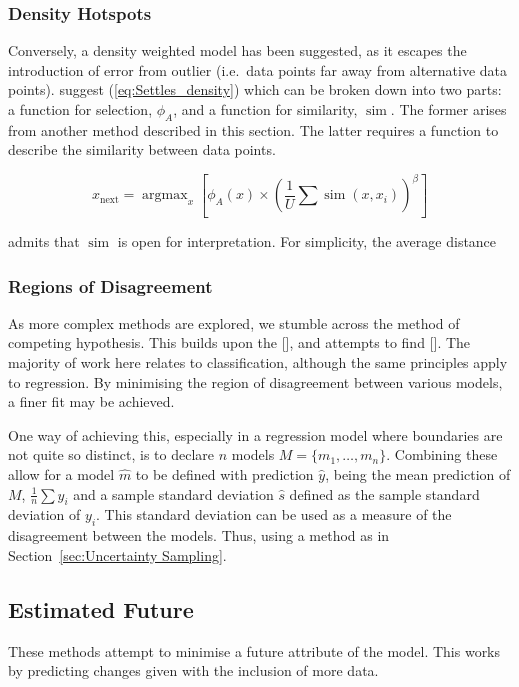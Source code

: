 \documentclass[a4paper, english]{report}
\DeclareMathOperator*{\argmax}{argmax}
\DeclareMathOperator*{\simm}{sim}
\begin{document}
\subsubsection{Density Hotspots}
Conversely, a density weighted model has been suggested, as it escapes the introduction of error from outlier (i.e.\ data points far away from alternative data points). \textcite{Settles_2008} suggest (\ref{eq:Settles_density}) which can be broken down into two parts: a function for selection, $\phi_A$, and a function for similarity, $\simm$. The former arises from  another method described in this section. The latter requires a function to describe the similarity between data points.

\begin{equation}
    \label{eq:Settles_density}
    x_\mathrm{next}=\argmax_x{\left[\phi_A(x)\times{\left(\frac{1}{U}\sum{\simm{(x, x_i)}}\right)}^\beta\right]}
\end{equation}

\textcite{Settles_2008} admits that $\simm$ is open for interpretation. For simplicity, the average distance

\subsubsection{Regions of Disagreement}
As more complex methods are explored, we stumble across the method of competing hypothesis. This builds upon the [], and attempts to find []. The majority of work here relates to classification, although the same principles apply to regression. By minimising the region of disagreement between various models, a finer fit may be achieved.

One way of achieving this, especially in a regression model where boundaries are not quite so distinct, is to declare $n$ models ${M = \{m_1,\ldots{}, m_n\}}$. Combining these allow for a model $\hat{m}$ to be defined with prediction $\hat{y}$, being the mean prediction of $M$, ${\frac{1}{n}\sum{y_i}}$ and a sample standard deviation $\hat{s}$ defined as the sample standard deviation of $y_i$. This standard deviation can be used as a measure of the disagreement between the models. Thus, using a method as in Section~\ref{sec:Uncertainty Sampling}.

\subsection{Estimated Future}
These methods attempt to minimise a future attribute of the model. This works by predicting changes given with the inclusion of more data.
\end{document}
